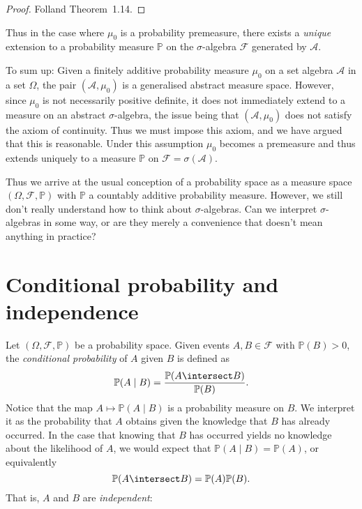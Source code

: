 \documentclass[article, a4paper, 11pt, oneside]{memoir}
\numberwithin{equation}{chapter}
\newcommand{\calF}{\mathcal{F}}
\newcommand{\calA}{\mathcal{A}}
\renewcommand{\P}{\mathbb{P}}
\begin{document}
\begin{proof}
    Folland Theorem~1.14.
\end{proof}
%
Thus in the case where $\mu_0$ is a probability premeasure, there exists a \emph{unique} extension to a probability measure $\P$ on the $\sigma$-algebra $\calF$ generated by $\calA$.

To sum up: Given a finitely additive probability measure $\mu_0$ on a set algebra $\calA$ in a set $\Omega$, the pair $(\calA,\mu_0)$ is a generalised abstract measure space. However, since $\mu_0$ is not necessarily positive definite, it does not immediately extend to a measure on an abstract $\sigma$-algebra, the issue being that $(\calA,\mu_0)$ does not satisfy the axiom of continuity. Thus we must impose this axiom, and we have argued that this is reasonable. Under this assumption $\mu_0$ becomes a premeasure and thus extends uniquely to a measure $\P$ on $\calF = \sigma(\calA)$.

Thus we arrive at the usual conception of a probability space as a measure space $(\Omega,\calF,\P)$ with $\P$ a countably additive probability measure. However, we still don't really understand how to think about $\sigma$-algebras. Can we interpret $\sigma$-algebras in some way, or are they merely a convenience that doesn't mean anything in practice?

\newcommand{\condP}[2]{\P(#1 \mid #2)}

\section{Conditional probability and independence}

Let $(\Omega,\calF,\P)$ be a probability space. Given events $A,B \in \calF$ with $\P(B) > 0$, the \emph{conditional probability} of $A$ given $B$ is defined as
%
\begin{equation*}
    \condP{A}{B}
        = \frac{ \P(A \intersect B) }{ \P(B) }.
\end{equation*}
%
Notice that the map $A \mapsto \condP{A}{B}$ is a probability measure on $B$. We interpret it as the probability that $A$ obtains given the knowledge that $B$ has already occurred. In the case that knowing that $B$ has occurred yields no knowledge about the likelihood of $A$, we would expect that $\condP{A}{B} = \P(A)$, or equivalently
%
\begin{equation*}
    \P(A \intersect B) = \P(A) \P(B).
\end{equation*}
%
That is, $A$ and $B$ are \emph{independent}:
\end{document}
